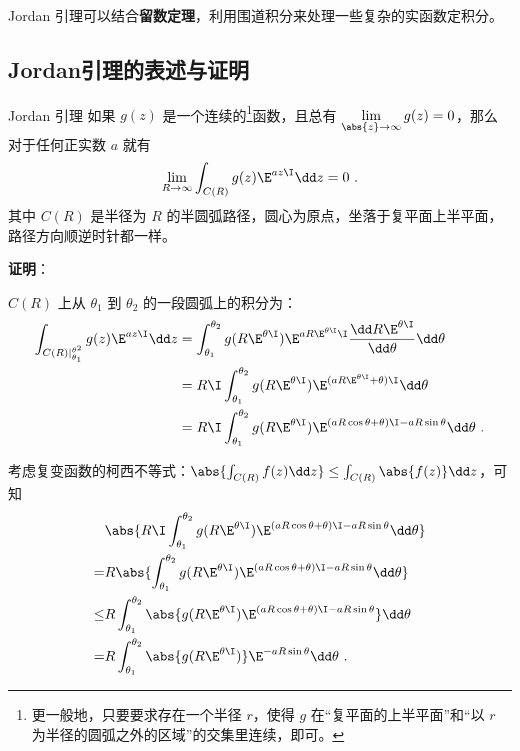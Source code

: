 



Jordan 引理可以结合\textbf{留数定理}，利用围道积分来处理一些复杂的实函数定积分。

\subsection{Jordan引理的表述与证明}

\begin{theorem}{Jordan 引理}\label{the_JdLem_1}
如果 $g(z)$ 是一个连续的\footnote{更一般地，只要要求存在一个半径 $r$，使得 $g$ 在“复平面的上半平面”和“以 $r$ 为半径的圆弧之外的区域”的交集里连续，即可。}函数，且总有 $\lim\limits_{\abs{z}\to\infty}g(z)=0$，那么对于任何正实数 $a$ 就有
\begin{equation}
\lim\limits_{R\to \infty}\int_{C(R)}g(z)\E^{az\I}\dd z=0~.
\end{equation}
其中 $C(R)$ 是半径为 $R$ 的半圆弧路径，圆心为原点，坐落于复平面上半平面，路径方向顺逆时针都一样。


\end{theorem}

\textbf{证明}：

$C(R)$ 上从 $\theta_1$ 到 $\theta_2$ 的一段圆弧上的积分为：
\begin{equation}
\begin{aligned}
\int_{C(R)|_{\theta_1}^{\theta^2}}g(z)\E^{az\I}\dd z&=\int_{\theta_1}^{\theta_2}g( R\E^{\theta\I} )\E^{aR\E^{\theta\I}\I}\frac{\dd R\E^{\theta\I}}{\dd \theta}\dd\theta\\
&=R\I\int_{\theta_1}^{\theta_2}g(R\E^{\theta\I})\E^{(aR\E^{\theta\I}+\theta)\I}\dd\theta\\
&=R\I\int_{\theta_1}^{\theta_2}g(R\E^{\theta\I})\E^{(aR\cos\theta+\theta)\I-aR\sin\theta}\dd\theta~.
\end{aligned}
\end{equation}


考虑复变函数的柯西不等式：$\abs{\int_{C(R)}f(z)\dd z} \leq \int_{C(R)}\abs{f(z)}\dd z$，可知
\begin{equation}\label{eq_JdLem_4}
\begin{aligned}
&\abs{R\I\int_{\theta_1}^{\theta_2}g(R\E^{\theta\I})\E^{(aR\cos\theta+\theta)\I-aR\sin\theta}\dd\theta}\\
=&R\abs{\int_{\theta_1}^{\theta_2}g(R\E^{\theta\I})\E^{(aR\cos\theta+\theta)\I-aR\sin\theta}\dd\theta}\\
\leq&R\int_{\theta_1}^{\theta_2}\abs{g(R\E^{\theta\I})\E^{(aR\cos\theta+\theta)\I-aR\sin\theta}}\dd\theta\\
=&R\int_{\theta_1}^{\theta_2}\abs{g(R\E^{\theta\I})}\E^{-aR\sin\theta}\dd\theta~.
\end{aligned}
\end{equation}


